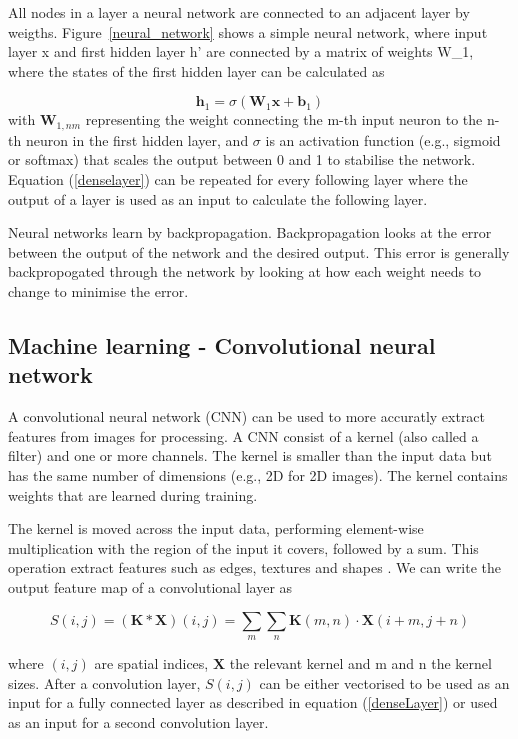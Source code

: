 \documentclass{article}
\begin{document}
All nodes in a layer a neural network are connected to an adjacent layer by weigths. Figure~\ref{neural_network} shows a simple neural network, where input layer x and first hidden layer h' are connected by a matrix of weights W\_1, where the states of the first hidden layer can be calculated as

\begin{equation}
\label{denseLayer}
\mathbf{h}_1 = \sigma(\mathbf{W}_1 \mathbf{x} + \mathbf{b}_1)
\end{equation}
with $\mathbf{W}_{1,nm}$ representing the weight connecting the m-th input neuron to the n-th neuron in the first hidden layer, and $\sigma$ is an activation function (e.g., sigmoid or softmax) that scales the output between 0 and 1 to stabilise the network. Equation (\ref{denselayer}) can be repeated for every following layer where the output of a layer is used as an input to calculate the following layer.

Neural networks learn by backpropagation. Backpropagation looks at the error between the output of the network and the desired output. This error is generally backpropogated through the network by looking at how each weight needs to change to minimise the error.

\subsection{Machine learning - Convolutional neural network}

A convolutional neural network (CNN) can be used to more accuratly extract features from images for processing. A CNN consist of a kernel (also called a filter) and one or more channels. The kernel is smaller than the input data but has the same number of dimensions (e.g., 2D for 2D images). The kernel contains weights that are learned during training.

The kernel is moved across the input data, performing element-wise multiplication with the region of the input it covers, followed by a sum. This operation extract features such as edges, textures and shapes \citep{yamashita2018convolutional}. We can write the output feature map of a convolutional layer as

\begin{equation}
S(i, j) = (\mathbf{K} * \mathbf{X})(i, j) = \sum_m \sum_n \mathbf{K}(m, n) \cdot \mathbf{X}(i + m, j + n)
\end{equation}

where $(i,j)$ are spatial indices, $\mathbf{X}$ the relevant kernel and m and n the kernel sizes. After a convolution layer, $S(i, j)$ can be either vectorised to be used as an input for a fully connected layer as described in equation (\ref{denseLayer}) or used as an input for a second convolution layer.
\end{document}
